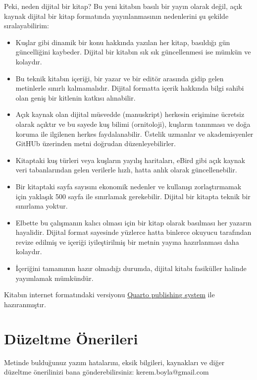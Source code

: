 \documentclass[
  letterpaper,
  DIV=11,
  numbers=noendperiod]{scrreprt}
\begin{document}
Peki, neden dijital bir kitap? Bu yeni kitabın basılı bir yayın olarak
değil, açık kaynak dijital bir kitap formatında yayınlanmasının
nedenlerini şu şekilde sıralayabilirim:

\begin{itemize}
\item
  Kuşlar gibi dinamik bir konu hakkında yazılan her kitap, basıldığı gün
  güncelliğini kaybeder. Dijital bir kitabın sık sık güncellenmesi ise
  mümkün ve kolaydır.
\item
  Bu teknik kitabın içeriği, bir yazar ve bir editör arasında gidip
  gelen metinlerle sınırlı kalmamalıdır. Dijital formatta içerik
  hakkında bilgi sahibi olan geniş bir kitlenin katkısı alınabilir.
\item
  Açık kaynak olan dijital müsvedde (manuskript) herkesin erişimine
  ücretsiz olarak açıktır ve bu sayede kuş bilimi (ornitoloji), kuşların
  tanınması ve doğa koruma ile ilgilenen herkes faydalanabilir. Üstelik
  uzmanlar ve akademisyenler GitHUb üzerinden metni doğrudan
  düzenleyebilirler.
\item
  Kitaptaki kuş türleri veya kuşların yayılış haritaları, eBird gibi
  açık kaynak veri tabanlarından gelen verilerle hızlı, hatta anlık
  olarak güncellenebilir.
\item
  Bir kitaptaki sayfa sayısını ekonomik nedenler ve kullanışı
  zorlaştırmamak için yaklaşık 500 sayfa ile sınırlamak gerekebilir.
  Dijital bir kitapta teknik bir sınırlama yoktur.
\item
  Elbette bu çalışmanın kalıcı olması için bir kitap olarak basılması
  her yazarın hayalidir. Dijital format sayesinde yüzlerce hatta
  binlerce okuyucu tarafından revize edilmiş ve içeriği iyileştirilmiş
  bir metnin yayına hazırlanması daha kolaydır.
\item
  İçeriğini tamamının hazır olmadığı durumda, dijital kitabı fasiküller
  halinde yayımlamak mümkündür.
\end{itemize}

Kitabın internet formatındaki versiyonu
\href{https://quarto.org/}{Quarto publishing system} ile hazıranmıştır.

\section*{Düzeltme Önerileri}\label{duxfczeltme-uxf6nerileri}


Metinde bulduğunuz yazım hatalarını, eksik bilgileri, kaynakları ve
diğer düzeltme önerilinizi bana gönderebilirsiniz: kerem.boyla@gmail.com
\end{document}
